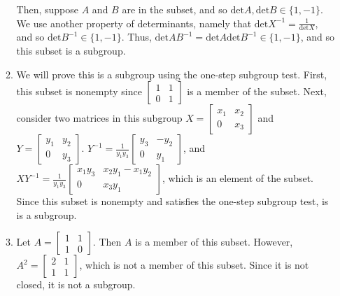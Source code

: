 \documentclass{article}
\begin{document}
\begin{enumerate}
\begin{enumerate}
            Then, suppose $A$ and $B$ are in the subset, and so $\text{det}A, \text{det}B \in \{1, -1\}$. We use another property of determinants, namely that $\text{det}X^{-1} = \frac{1}{\text{det}X}$, and so $\text{det}B^{-1} \in \{1, -1\}$. Thus, $\text{det}AB^{-1} = \text{det}A\text{det}B^{-1} \in \{1, -1\}$, and so this subset is a subgroup. 

            \item We will prove this is a subgroup using the one-step subgroup test. First, this subset is nonempty since $\begin{bmatrix}
                1 & 1 \\ 0 & 1
            \end{bmatrix}$ is a member of the subset. Next, consider two matrices in this subgroup $X = \begin{bmatrix}
                x_1 & x_2 \\ 0 & x_3
            \end{bmatrix}$ and $Y = \begin{bmatrix}
                y_1 & y_2 \\ 0 & y_3
            \end{bmatrix}$. $Y^{-1} = \frac{1}{y_1y_3}\begin{bmatrix}
                y_3 & -y_2 \\ 0 & y_1
            \end{bmatrix}$, and $XY^{-1} = \frac{1}{y_1y_3} \begin{bmatrix}
                x_1y_3 & x_2y_1 - x_1y_2 \\ 0 & x_3y_1
            \end{bmatrix}$, which is an element of the subset. Since this subset is nonempty and satisfies the one-step subgroup test, is is a subgroup. 

            \item Let $A = \begin{bmatrix}
                1 & 1 \\ 1 & 0
            \end{bmatrix}$. Then $A$ is a member of this subset. However, $A^2 = \begin{bmatrix}
                2 & 1 \\ 1 & 1
            \end{bmatrix}$, which is not a member of this subset. Since it is not closed, it is not a subgroup. 


\end{enumerate}
\end{enumerate}
\end{document}
